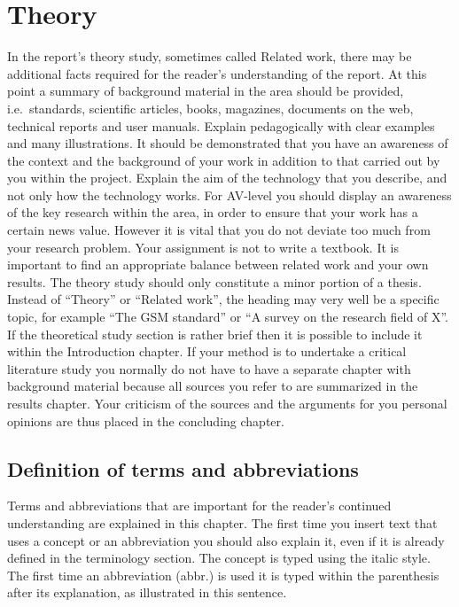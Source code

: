 \section{Theory}\label{sec:theory} 
In the report's theory study, sometimes called Related work, there may be
additional facts required for the reader's understanding of the report. At this
point a summary of background material in the area should be provided, i.e.\
standards, scientific articles, books, magazines, documents on the web,
technical reports and user manuals. Explain pedagogically with clear examples
and many illustrations.  It should be demonstrated that you have an awareness of
the context and the background of your work in addition to that carried out by
you within the project. Explain the aim of the technology that you describe, and
not only how the technology works. For AV-level you should display an awareness
of the key research within the area, in order to ensure that your work has a
certain news value. However it is vital that you do not deviate too much from
your research problem.  Your assignment is not to write a textbook. It is
important to find an appropriate balance between related work and your own
results. The theory study should only constitute a minor portion of a thesis.
Instead of ``Theory'' or ``Related work'', the heading may very well be a specific
topic, for example ``The GSM standard'' or ``A survey on the research field of
X''.
If the theoretical study section is rather brief then it is possible to include
it within the Introduction chapter.  If your method is to undertake a critical
literature study you normally do not have to have a separate chapter with
background material because all sources you refer to are summarized in the
results chapter. Your criticism of the sources and the arguments for you
personal opinions are thus placed in the concluding chapter.

\subsection{Definition of terms and abbreviations}\label{subsec:definitionoftermsandabbreviations}
Terms and abbreviations that are important for the reader's continued
understanding are explained in this chapter. The first time you insert text that
uses a concept or an abbreviation you should also explain it, even if it is
already defined in the terminology section. The concept is typed using the
italic style.  The first time an abbreviation (abbr.) is used it is typed within
the parenthesis after its explanation, as illustrated in this sentence.
